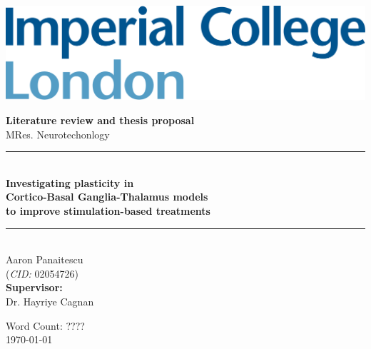 
\usepackage{xspace} 

\newcommand{\ballarrow}{\tikz[baseline=-0.6ex]{\draw[->] (0,0) -- (0.5,0); \filldraw (0.5,0) circle (2pt);}}
\newcommand{\Na}{$Na^+$\xspace}
\newcommand{\K}{$K^+$\xspace}
\newcommand{\Ca}{$Ca^{2+}$\xspace}



\begin{titlepage}
	\newcommand{\HRule}{\rule{\linewidth}{0.5mm}}
	\setlength{\topmargin}{0in}
	\center

	\begin{flushleft} \large
		\begin{minipage}{0.4\textwidth}
			\includegraphics[scale=0.14]{imperial.png}
		\end{minipage}
	\end{flushleft}
	\vspace{4cm}

	\textbf{\large Literature review and thesis proposal}\\[0.1cm]
	{\large MRes. Neurotechonlogy}\\[0.5cm]

	\HRule \\[0.4cm]
	{\Large \bfseries Investigating plasticity in \\ Cortico-Basal Ganglia-Thalamus models \\ to improve stimulation-based treatments }
	\HRule \\[1cm]


	{\large Aaron Panaitescu \\
	(\textit{CID:} 02054726) \\[0.4cm]
	\textbf{Supervisor:} \\
	Dr. Hayriye Cagnan}


	\vfill
	{Word Count: ????}\\[0.4cm]
	{\large \today}\\[0.8cm]
\end{titlepage}
